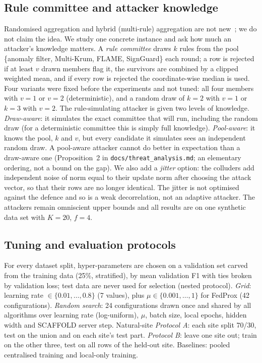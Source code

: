 \documentclass[conference]{IEEEtran}
\begin{document}
\subsection{Rule committee and attacker knowledge}
\label{sec:committee}
Randomised aggregation and hybrid (multi-rule) aggregation are not new~\cite{nabavirazavi2023randomization,yue2024hybrid}; we do not claim the idea. We study one concrete instance and ask how much an attacker's knowledge matters. A \emph{rule committee} draws $k$ rules from the pool \{anomaly filter, Multi-Krum, FLAME, SignGuard\} each round; a row is rejected if at least $v$ drawn members flag it, the survivors are combined by a clipped weighted mean, and if every row is rejected the coordinate-wise median is used. Four variants were fixed before the experiments and not tuned: all four members with $v{=}1$ or $v{=}2$ (deterministic), and a random draw of $k{=}2$ with $v{=}1$ or $k{=}3$ with $v{=}2$.
The rule-simulating attacker is given two levels of knowledge. \emph{Draw-aware}: it simulates the exact committee that will run, including the random draw (for a deterministic committee this is simply full knowledge). \emph{Pool-aware}: it knows the pool, $k$ and $v$, but every candidate it simulates sees an independent random draw. A pool-aware attacker cannot do better in expectation than a draw-aware one (Proposition~2 in \texttt{docs/threat\_analysis.md}; an elementary ordering, not a bound on the gap). We also add a \emph{jitter} option: the colluders add independent noise of norm equal to their update norm after choosing the attack vector, so that their rows are no longer identical. The jitter is not optimised against the defence and so is a weak decorrelation, not an adaptive attacker. The attackers remain omniscient upper bounds and all results are on one synthetic data set with $K{=}20$, $f{=}4$.
\subsection{Tuning and evaluation protocols}
For every dataset split, hyper-parameters are chosen on a validation set carved from the training data (25\%, stratified), by mean validation F1 with ties broken by validation loss; test data are never used for selection (nested protocol). \emph{Grid}: learning rate $\in\{0.01,\dots,0.8\}$ (7 values), plus $\mu\in\{0.001,\dots,1\}$ for FedProx (42 configurations). \emph{Random search}: 24 configurations drawn once and shared by all algorithms over learning rate (log-uniform), $\mu$, batch size, local epochs, hidden width and SCAFFOLD server step. Natural-site \emph{Protocol A}: each site split 70/30, test on the union and on each site's test part. \emph{Protocol B}: leave one site out; train on the other three, test on all rows of the held-out site. Baselines: pooled centralised training and local-only training.
\end{document}
